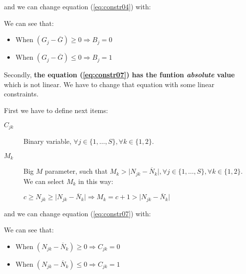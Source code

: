 \documentclass[a4paper,12pt]{article}
\begin{document}
and we can change equation (\ref{eq:constr04}) with:
\begin{lpformulation}
\end{lpformulation}
We can see that:
\begin{itemize}
	\item When $(G_j - \overline{G}) \ge 0 \Longrightarrow B_j = 0$
	\item When $(G_j - \overline{G}) \le 0 \Longrightarrow B_j = 1$
\end{itemize}


Secondly, \textbf{the equation (\ref{eq:constr07}) has the funtion \textit{absolute} value} which is not linear. We have to change that equation with some linear constraints.

First we have to define next items:
\begin{description}
	\item[$C_{jk}$] Binary variable, $\forall j \in \{1, \ldots , S\}, \forall k \in \{1, 2\}$.
	\item[$M_k$] Big $M$ parameter, such that $M_k > \lvert N_{jk} - \overline{N}_k \rvert, \forall j \in \{1, \ldots , S\}, \forall k \in \{1, 2\}$. We can select $M_k$ in this way: 
	
	$c \ge N_{jk} \ge \lvert N_{jk} - \overline{N}_k \rvert \Rightarrow M_k = c+1 > \lvert N_{jk} - \overline{N}_k \rvert$
\end{description}

and we can change equation (\ref{eq:constr07}) with:
\begin{lpformulation}
\end{lpformulation}
We can see that:
\begin{itemize}
	\item When $(N_{jk} - \overline{N}_k) \ge 0 \Longrightarrow C_{jk} = 0$
	\item When $(N_{jk} - \overline{N}_k) \le 0 \Longrightarrow C_{jk} = 1$
\end{itemize}
\end{document}
